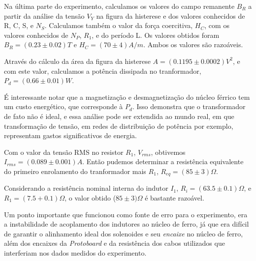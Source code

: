 \documentclass[11pt,a4paper]{article}
\begin{document}
    Na última parte do experimento, calculamos os valores do campo remanente $B_R$ a partir da análise da tensão $V_Y$ na figura da histerese e dos valores conhecidos de R, C, S, e $N_S$. Calculamos também o valor da força coercitiva, $H_C$, com os valores conhecidos de $N_P$, $R_1$, e do período L.
    Os valores obtidos foram $B_R = (0.23 \pm 0.02)T$ e $H_C = (70 \pm 4)A/m$. Ambos os valores são razoáveis.
    
    Através do cálculo da área da figura da histerese $A = (0.1195 \pm 0.0002)V^2$, e com este valor, calculamos a potência dissipada no tranformador, $P_d = (0.66 \pm 0.01)W$.
    
    É interessante notar que a magnetização e desmagnetização do núcleo férrico tem um custo energético, que corresponde à $P_d$. Isso demonstra que o transformador de fato não é ideal, e essa análise pode ser extendida ao mundo real, em que transformação de tensão, em redes de distribuição de potência por exemplo, representam gastos significativos de energia.
    
    Com o valor da tensão RMS no resistor $R_1$, $V_{rms}$, obtivemos $I_{rms} = (0.089 \pm 0.001)A$. Então pudemos determinar a resistência equivalente do primeiro enrolamento do tranformador mais $R_1$, $R_{eq} = (85 \pm 3)\Omega.$
    
    Considerando a resistência nominal interna do indutor $I_1$, $R_i = (63.5 \pm 0.1)\Omega$, e $R_1 = (7.5 + 0.1)\Omega$, o valor obtido ($85 \pm 3) \Omega$ é bastante razoável.
    
    Um ponto importante que funcionou como fonte de erro para o experimento, era a instabilidade de acoplamento dos indutores ao núcleo de ferro, já que era difícil de garantir o alinhamento ideal dos solenoides e seu \textit{encaixe} no núcleo de ferro, além dos encaixes da \textit{Protoboard} e da resistência dos cabos utilizados que interferiam nos dados medidos do experimento.
    
    
%
\end{document}
